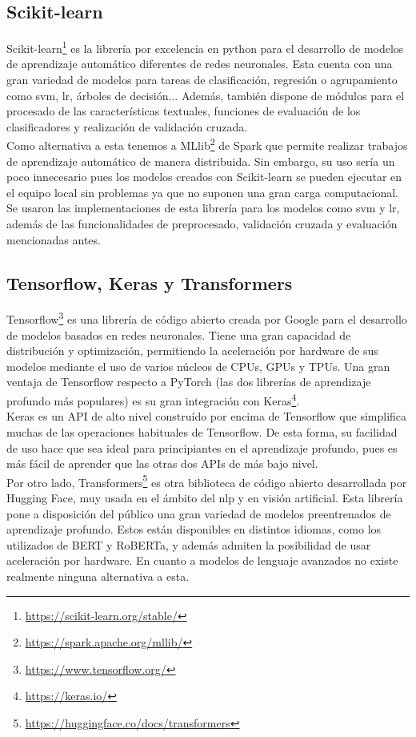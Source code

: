\subsection{Scikit-learn}
Scikit-learn\footnote{\url{https://scikit-learn.org/stable/}} es la librería por excelencia en python para el desarrollo de modelos de aprendizaje automático diferentes de redes neuronales. Esta cuenta con una gran variedad de modelos para tareas de clasificación, regresión o agrupamiento como \gls{svm}, \gls{lr}, árboles de decisión... Además, también dispone de módulos para el procesado de las características textuales, funciones de evaluación de los clasificadores y realización de validación cruzada.\\
Como alternativa a esta tenemos a MLlib\footnote{\url{https://spark.apache.org/mllib/}} de Spark que permite realizar trabajos de aprendizaje automático de manera distribuida. Sin embargo, su uso sería un poco innecesario pues los modelos creados con Scikit-learn se pueden ejecutar en el equipo local sin problemas ya que no suponen una gran carga computacional.
Se usaron las implementaciones de esta librería para los modelos como \gls{svm} y \gls{lr}, además de las funcionalidades de preprocesado, validación cruzada y  evaluación mencionadas antes.
\subsection{Tensorflow, Keras y Transformers}
Tensorflow\footnote{\url{https://www.tensorflow.org/}} es una librería de código abierto creada por Google para el desarrollo de modelos basados en redes neuronales. Tiene una gran capacidad de distribución y optimización, permitiendo la aceleración por hardware de sus modelos mediante el uso de varios núcleos de CPUs, GPUs y TPUs. Una gran ventaja de Tensorflow respecto a PyTorch (las dos librerías de aprendizaje profundo más populares) es su gran integración con Keras\footnote{\url{https://keras.io/}}.\\
Keras es un API de alto nivel construído por encima de Tensorflow que simplifica muchas de las operaciones habituales de Tensorflow. De esta forma, su facilidad de uso hace que sea ideal para principiantes en el aprendizaje profundo, pues es más fácil de aprender que las otras dos APIs de más bajo nivel.\\
Por otro lado, Transformers\footnote{\url{https://huggingface.co/docs/transformers}} es otra biblioteca de código abierto desarrollada por Hugging Face, muy usada en el ámbito del \acrlong{nlp} y en visión artificial. Esta librería pone a disposición del público una gran variedad de modelos preentrenados de aprendizaje profundo. Estos están disponibles en distintos idiomas, como los utilizados de BERT y RoBERTa, y además admiten la posibilidad de usar aceleración por hardware. En cuanto a modelos de lenguaje avanzados no existe realmente ninguna alternativa a esta.
